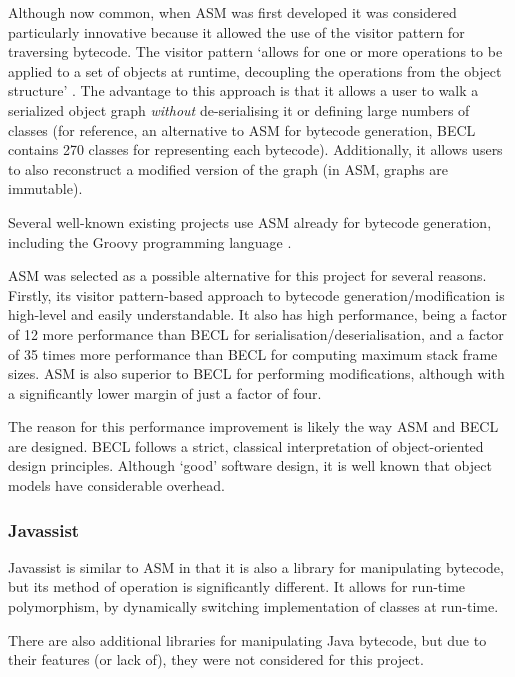                 Although now common, when ASM was first developed it was considered particularly innovative because it allowed the use of the visitor pattern \citep[p.~331]{Gamma1995} for traversing bytecode. The visitor pattern `allows for one or more operations to be applied to a set of objects at runtime, decoupling the operations from the object structure' \citep{McDonald2008}. The advantage to this approach is that it allows a user to walk a serialized object graph \emph{without} de-serialising it or defining large numbers of classes (for reference, an alternative to ASM for bytecode generation, BECL \citep{ApacheBECL} contains 270 classes for representing each bytecode). Additionally, it allows users to also reconstruct a modified version of the graph (in ASM, graphs are immutable).

                Several well-known existing projects use ASM already for bytecode generation, including the Groovy programming language \citep{GroovyDocs}.

                ASM was selected as a possible alternative for this project for several reasons. Firstly, its visitor pattern-based approach to bytecode generation/modification is high-level and easily understandable. It also has high performance, being a factor of 12 more performance than BECL for serialisation/deserialisation, and a factor of 35 times more performance than BECL for computing maximum stack frame sizes. ASM is also superior to BECL for performing modifications, although with a significantly lower margin of just a factor of four.

                The reason for this performance improvement is likely the way ASM and BECL are designed. BECL follows a strict, classical interpretation of object-oriented design principles. Although `good' software design, it is well known that object models have considerable overhead.

                \subsubsection{Javassist} \label{sec:instrumentation/alt-instr/bytecode-instr/javassist}
                Javassist \citep{Chiba1998} is similar to ASM in that it is also a library for manipulating bytecode, but its method of operation is significantly different. It allows for run-time polymorphism, by dynamically switching implementation of classes at run-time.

                There are also additional libraries for manipulating Java bytecode, but due to their features (or lack of), they were not considered for this project.

